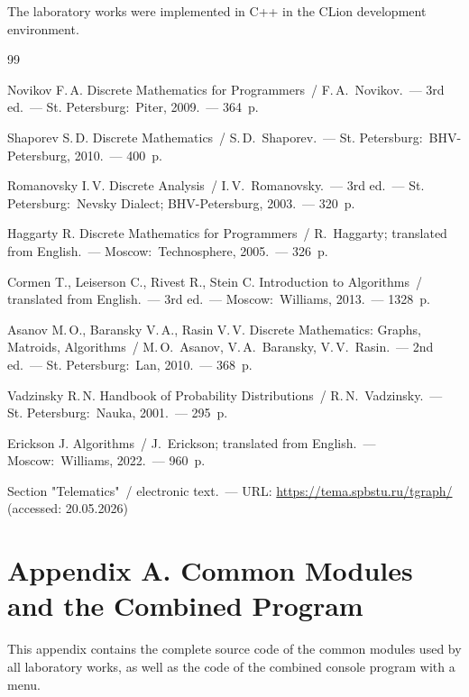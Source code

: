 \documentclass[a4paper,final]{article}
\begin{document}
The laboratory works were implemented in C++ in the CLion development environment.

\clearpage
{}
\begin{thebibliography}{99}

	Novikov F.\,A. Discrete Mathematics for Programmers~/ F.\,A.~Novikov.~---
	3rd ed.~--- St. Petersburg:~Piter, 2009.~--- 364~p.

	Shaporev S.\,D. Discrete Mathematics~/ S.\,D.~Shaporev.~---
	St. Petersburg:~BHV-Petersburg, 2010.~--- 400~p.

	Romanovsky I.\,V. Discrete Analysis~/ I.\,V.~Romanovsky.~---
	3rd ed.~--- St. Petersburg:~Nevsky Dialect; BHV-Petersburg, 2003.~--- 320~p.

	Haggarty R. Discrete Mathematics for Programmers~/ R.~Haggarty; translated from English.~---
	Moscow:~Technosphere, 2005.~--- 326~p.

	Cormen T., Leiserson C., Rivest R., Stein C. Introduction to Algorithms~/ translated from English.~---
	3rd ed.~--- Moscow:~Williams, 2013.~--- 1328~p.

	Asanov M.\,O., Baransky V.\,A., Rasin V.\,V. Discrete Mathematics: Graphs, Matroids, Algorithms~/ M.\,O.~Asanov, V.\,A.~Baransky, V.\,V.~Rasin.~---
	2nd ed.~--- St. Petersburg:~Lan, 2010.~--- 368~p.

	Vadzinsky R.\,N. Handbook of Probability Distributions~/ R.\,N.~Vadzinsky.~---
	St. Petersburg:~Nauka, 2001.~--- 295~p.

	Erickson J. Algorithms~/ J.~Erickson; translated from English.~---
	Moscow:~Williams, 2022.~--- 960~p.

	Section "Telematics"~/ electronic text.~---
	URL: \url{https://tema.spbstu.ru/tgraph/}
	(accessed: 20.05.2026)

\end{thebibliography}

\clearpage
\section*{Appendix A. Common Modules and the Combined Program}

This appendix contains the complete source code of the common modules used by all laboratory works, as well as the code of the combined console program with a menu.
\end{document}
